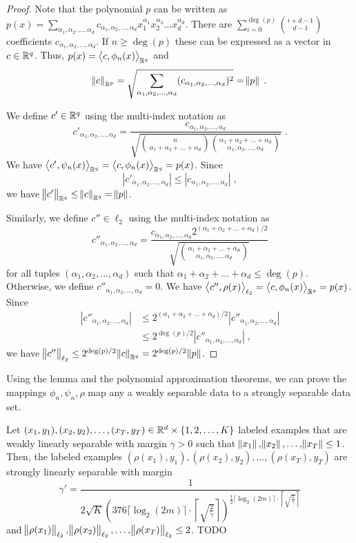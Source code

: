 \begin{proof}
Note that the polynomial $p$ can be written as
$p(x) = \sum_{\alpha_1, \alpha_2, \dots, \alpha_d} c_{\alpha_1, \alpha_2, \dots, \alpha_d} x_1^{\alpha_1} x_2^{\alpha_2} \dots x_d^{\alpha_d}$.
There are $\sum_{i=0}^{\deg(p)} \binom{i+d-1}{d-1}$ coefficients $c_{\alpha_1, \alpha_2, \dots, \alpha_d}$.
If $n \ge \deg(p)$ these can be expressed as a vector in $c \in \mathbb{R}^q$. Thus, $p(x) = \left\langle c, \phi_n(x) \right\rangle_{\mathbb{R}^q}$
and
$$
\norm{c}_{\mathbb{R}^p} = \sqrt{\sum_{\alpha_1, \alpha_2, \dots, \alpha_d} (c_{\alpha_1, \alpha_2, \dots, \alpha_d})^2} =  \norm{p} \; .
$$

We define $c' \in \mathbb{R}^q$ using the multi-index notation as
$$
c'_{\alpha_1, \alpha_2, \dots, \alpha_d}
= \frac{c_{\alpha_1, \alpha_2, \dots, \alpha_d}}{\sqrt{\binom{n}{\alpha_1 + \alpha_2 + \dots + \alpha_d} \binom{\alpha_1 + \alpha_2 + \dots + \alpha_d}{\alpha_1, \alpha_2, \dots, \alpha_d}}} \; .
$$
We have $\left\langle c', \psi_n(x) \right\rangle_{\mathbb{R}^q} = \left\langle c, \phi_n(x) \right\rangle_{\mathbb{R}^q} = p(x)$. Since
$$
|c'_{\alpha_1, \alpha_2, \dots, \alpha_d}| \le |c_{\alpha_1, \alpha_2, \dots, \alpha_d}| \; ,
$$
we have $\norm{c'}_{\mathbb{R}^q} \le \norm{c}_{\mathbb{R}^q} = \norm{p}$.

Similarly, we define $c'' \in \ell_2$ using the multi-index notation as
$$
c''_{\alpha_1, \alpha_2, \dots, \alpha_d}
= \frac{c_{\alpha_1, \alpha_2, \dots, \alpha_d} 2^{(\alpha_1 + \alpha_2 + \dots + \alpha_d)/2}}{\sqrt{\binom{\alpha_1 + \alpha_2 + \dots + \alpha_d}{\alpha_1, \alpha_2, \dots, \alpha_d}}}
$$
for all tuples $(\alpha_1, \alpha_2, \dots, \alpha_d)$ such that $\alpha_1 + \alpha_2 + \dots + \alpha_d \le \deg(p)$.
Otherwise, we define $c''_{\alpha_1, \alpha_2, \dots, \alpha_d} = 0$. We have
$\left\langle c'', \rho(x) \right\rangle_{\ell_2} = \left\langle c, \phi_n(x) \right\rangle_{\mathbb{R}^q} = p(x)$. Since
\begin{align*}
|c''_{\alpha_1, \alpha_2, \dots, \alpha_d}|
& \le 2^{(\alpha_1 + \alpha_2 + \dots + \alpha_d)/2} |c''_{\alpha_1, \alpha_2, \dots, \alpha_d}| \\
& \le 2^{\deg(p)/2} |c''_{\alpha_1, \alpha_2, \dots, \alpha_d}| \; ,
\end{align*}
we have $\norm{c''}_{\ell_2} \le 2^{\deg(p)/2} \norm{c}_{\mathbb{R}^q} = 2^{\deg(p)/2} \norm{p}$.
\end{proof}

Using the lemma and the polynomial approximation theorems, we can prove
the mappings $\phi_n, \psi_n, \rho$ map any a weakly separable data
to a strongly separable data set.

\begin{theorem}
Let $(x_1, y_1), (x_2, y_2), \dots, (x_T, y_T) \in \mathbb{R}^d \times \{1,2,\dots,K\}$
labeled examples that are weakly linearly separable with margin $\gamma > 0$
such that $\norm{x_1}, \norm{x_2}, \dots, \norm{x_T} \le 1$. Then, the labeled
examples $(\rho(x_1), y_1), (\rho(x_2), y_2), \dots, (\rho(x_T), y_T)$ are
strongly linearly separable with margin
$$
\gamma' = \frac{1}{2\sqrt{K} \left(376 \lceil \log_2(2m) \rceil \cdot \left \lceil \sqrt{\frac{2}{\gamma}} \right \rceil \right)^{\frac{1}{2} \lceil \log_2(2m) \rceil \cdot \left \lceil \sqrt{\frac{2}{\gamma}} \right \rceil}}
$$
and $\norm{\rho(x_1)}_{\ell_2}, \norm{\rho(x_2)}_{\ell_2}, \dots, \norm{\rho(x_T)}_{\ell_2} \le 2$.
TODO
\end{theorem}

